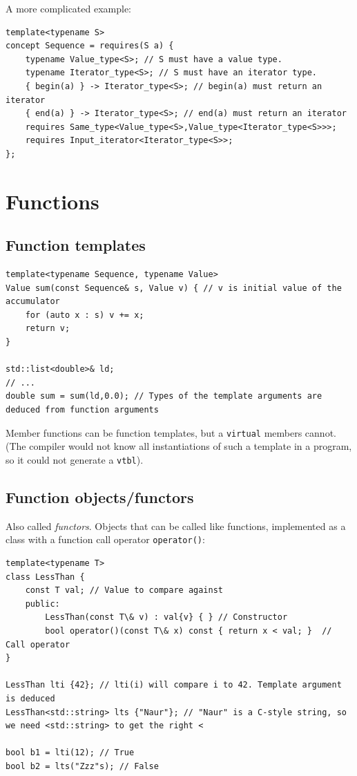 \documentclass[table, xcdraw]{article}%
\begin{document}
A more complicated example:

\begin{verbatim}
template<typename S>
concept Sequence = requires(S a) {
    typename Value_type<S>; // S must have a value type.
    typename Iterator_type<S>; // S must have an iterator type.
    { begin(a) } -> Iterator_type<S>; // begin(a) must return an iterator
    { end(a) } -> Iterator_type<S>; // end(a) must return an iterator
    requires Same_type<Value_type<S>,Value_type<Iterator_type<S>>>;
    requires Input_iterator<Iterator_type<S>>;
};
\end{verbatim}

\section{Functions}

\subsection{Function templates}

\begin{verbatim}
template<typename Sequence, typename Value>
Value sum(const Sequence& s, Value v) { // v is initial value of the accumulator
    for (auto x : s) v += x;
    return v;
}

std::list<double>& ld;
// ...
double sum = sum(ld,0.0); // Types of the template arguments are deduced from function arguments
\end{verbatim}

Member functions can be function templates, but a \texttt{virtual} members cannot. (The compiler would not know all instantiations of such a template in a program, so it could not generate a \texttt{vtbl}).

\subsection{Function objects/functors} \label{functors}

Also called \textit{functors}. Objects that can be called like functions, implemented as a class with a function call operator \texttt{operator()}:

\begin{verbatim}
template<typename T>
class LessThan {
    const T val; // Value to compare against
    public:
        LessThan(const T\& v) : val{v} { } // Constructor
        bool operator()(const T\& x) const { return x < val; }  // Call operator
}

LessThan lti {42}; // lti(i) will compare i to 42. Template argument is deduced
LessThan<std::string> lts {"Naur"}; // "Naur" is a C-style string, so we need <std::string> to get the right <

bool b1 = lti(12); // True
bool b2 = lts("Zzz"s); // False
\end{verbatim}
\end{document}

